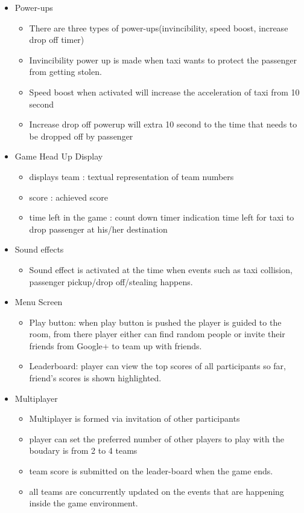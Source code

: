 \begin{itemize}
\begin{itemize}
	\end{itemize}	
	\item Power-ups
	\begin{itemize}
		\item There are three types of power-ups(invincibility, speed boost, increase drop off timer)
		\item Invincibility power up is made when taxi wants to protect the passenger from getting stolen.
		\item Speed boost when activated will increase the acceleration of taxi from  10 second
		\item Increase drop off powerup will extra 10 second to the time that needs to be dropped off by passenger   
	\end{itemize}	
	\item Game Head Up Display
	\begin{itemize}
		\item displays team : textual representation of team numbers 
		\item score : achieved score 
		\item time left in the game : count down timer indication time left for taxi to drop passenger at his/her destination
	\end{itemize}	
	\item Sound effects
	\begin{itemize}
		\item Sound effect is activated at the time when events such as taxi collision, passenger pickup/drop off/stealing happens. 
	\end{itemize}	
	\item Menu Screen
	\begin{itemize}
		\item Play button: when play button is pushed the player is guided to the room, from there player either can find random people or invite their friends from Google+ to team up with friends. 
		\item Leaderboard: player can view the top scores of all participants so far, friend’s scores is shown highlighted.
	\end{itemize}	
	\item Multiplayer
	\begin{itemize}
		\item Multiplayer is formed via invitation of other participants 
		\item player can set the preferred number of other players to play with the boudary is from 2 to 4 teams 
		\item team score is submitted on the leader-board when the game ends.
		\item all teams are concurrently updated on the events that are happening inside the game environment.
	\end{itemize}	
\end{itemize}